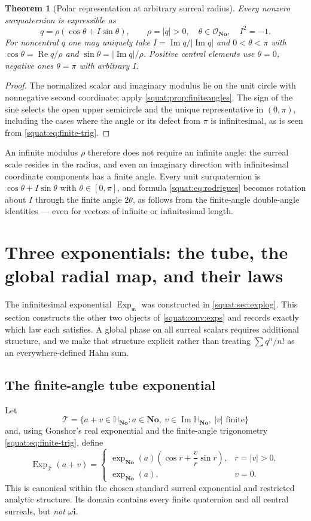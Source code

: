 \documentclass[11pt,letterpaper]{article}
\numberwithin{equation}{section}
\newtheorem{theorem}{Theorem}[section]
\theoremstyle{definition}
\theoremstyle{remark}
\newcommand{\No}{\mathbf{No}}
\newcommand{\SQ}{\mathbb H_{\No}}
\newcommand{\OO}{\mathcal O}
\newcommand{\mm}{\mathfrak m}
\newcommand{\ii}{\mathbf i}
\newcommand{\Rea}{\operatorname{Re}}
\newcommand{\Ima}{\operatorname{Im}}
\newcommand{\Exp}{\operatorname{Exp}}
\newcommand{\Expm}{\Exp_{\mm}}
\newcommand{\Expt}{\Exp_{\mathcal T}}
\newcommand{\abs}[1]{\left|#1\right|}
\begin{document}
\begin{theorem}[Polar representation at arbitrary surreal radius]\label{squat:thm:polar}
Every nonzero surquaternion is expressible as
\[
 q=\rho(\cos\theta+I\sin\theta),\qquad \rho=\abs q>0,\quad
 \theta\in\OO_{\No},\quad I^2=-1 .
\]
For noncentral $q$ one may uniquely take $I=\Ima q/\abs{\Ima q}$ and $0<\theta<\pi$ with
$\cos\theta=\Rea q/\rho$ and $\sin\theta=\abs{\Ima q}/\rho$. Positive central elements use
$\theta=0$, negative ones $\theta=\pi$ with arbitrary $I$.
\end{theorem}
\begin{proof}
The normalized scalar and imaginary modulus lie on the unit circle with nonnegative second
coordinate; apply \cref{squat:prop:finiteangles}. The sign of the sine selects the open
upper semicircle and the unique representative in $(0,\pi)$, including the cases where the
angle or its defect from $\pi$ is infinitesimal, as is seen from
\cref{squat:eq:finite-trig}.
\end{proof}

An infinite modulus $\rho$ therefore does not require an infinite angle: the surreal scale
resides in the radius, and even an imaginary direction with infinitesimal coordinate
components has a finite angle. Every unit surquaternion is $\cos\theta+I\sin\theta$ with
$\theta\in[0,\pi]$, and formula \cref{squat:eq:rodrigues} becomes rotation about $I$
through the finite angle $2\theta$, as follows from the finite-angle double-angle
identities --- even for vectors of infinite or infinitesimal length.

\section{Three exponentials: the tube, the global radial map, and their laws}\label{squat:sec:exponentials}

The infinitesimal exponential $\Expm$ was constructed in \cref{squat:sec:explog}. This
section constructs the other two objects of \cref{squat:conv:exps} and records exactly
which law each satisfies. A global phase on all surreal scalars requires additional
structure, and we make that structure explicit rather than treating $\sum q^n/n!$ as an
everywhere-defined Hahn sum.

\subsection{The finite-angle tube exponential}\label{squat:sub:tube}
Let
\[
 \mathcal T=\{a+v\in\SQ:a\in\No,\ v\in\Ima\SQ,\ \abs v\text{ finite}\}
\]
and, using Gonshor's real exponential and the finite-angle trigonometry
\cref{squat:eq:finite-trig}, define
\begin{equation}\label{squat:eq:tubeexp}
 \Expt(a+v)=
 \begin{cases}
 \exp_{\No}(a)\left(\cos r+\dfrac{v}{r}\sin r\right),&r=\abs v>0,\\[2pt]
 \exp_{\No}(a),&v=0 .
 \end{cases}
\end{equation}
This is canonical within the chosen standard surreal exponential and restricted analytic
structure. Its domain contains every finite quaternion and all central surreals, but
\emph{not} $\omega\ii$.
\end{document}
